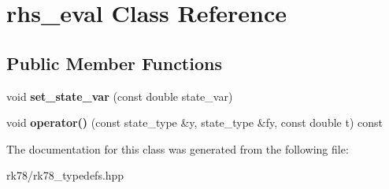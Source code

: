 \hypertarget{classrhs__eval}{}\section{rhs\+\_\+eval Class Reference}
\label{classrhs__eval}
\subsection*{Public Member Functions}
\begin{DoxyCompactItemize}
\item 
void {\bfseries set\+\_\+state\+\_\+var} (const double state\+\_\+var)\hypertarget{classrhs__eval_a4709425816e20b17c467282c9a63c6e5}{}\label{classrhs__eval_a4709425816e20b17c467282c9a63c6e5}

\item 
void {\bfseries operator()} (const state\+\_\+type \&y, state\+\_\+type \&fy, const double t) const \hypertarget{classrhs__eval_a91da050fdbf05036fb833dbae1248e15}{}\label{classrhs__eval_a91da050fdbf05036fb833dbae1248e15}

\end{DoxyCompactItemize}


The documentation for this class was generated from the following file\+:\begin{DoxyCompactItemize}
\item 
rk78/rk78\+\_\+typedefs.\+hpp\end{DoxyCompactItemize}
